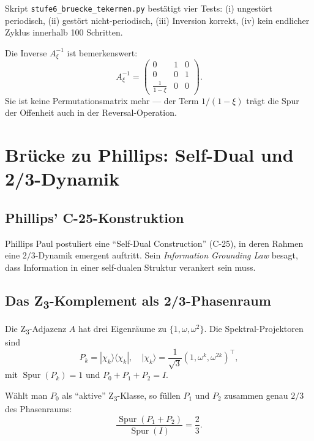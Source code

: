 Skript \texttt{stufe6\_bruecke\_tekermen.py} bestätigt vier Tests: (i) ungestört periodisch, (ii) gestört nicht-periodisch, (iii) Inversion korrekt, (iv) kein endlicher Zyklus innerhalb 100 Schritten.

Die Inverse \(A_\xi^{-1}\) ist bemerkenswert:
\begin{equation}
A_\xi^{-1} = \begin{pmatrix} 0 & 1 & 0 \\ 0 & 0 & 1 \\ \frac{1}{1-\xi} & 0 & 0 \end{pmatrix}.
\end{equation}
Sie ist keine Permutationsmatrix mehr — der Term \(1/(1-\xi)\) trägt die Spur der Offenheit auch in der Reversal-Operation.

\section{Brücke zu Phillips: Self-Dual und 2/3-Dynamik}
\label{sec:phillips}

\subsection{Phillips' C-25-Konstruktion}

Phillips Paul postuliert eine ``Self-Dual Construction'' (C-25), in deren Rahmen eine \(2/3\)-Dynamik emergent auftritt. Sein \emph{Information Grounding Law} besagt, dass Information in einer self-dualen Struktur verankert sein muss.

\subsection{Das Z\textsubscript{3}-Komplement als 2/3-Phasenraum}

Die Z\textsubscript{3}-Adjazenz \(A\) hat drei Eigenräume zu \(\{1, \omega, \omega^2\}\). Die Spektral-Projektoren sind
\begin{equation}
P_k = |\chi_k\rangle\langle\chi_k|, \quad |\chi_k\rangle = \frac{1}{\sqrt{3}}(1, \omega^k, \omega^{2k})^\top,
\end{equation}
mit \(\operatorname{Spur}(P_k) = 1\) und \(P_0 + P_1 + P_2 = I\).

\begin{keyresult}
Wählt man \(P_0\) als ``aktive'' Z\textsubscript{3}-Klasse, so füllen \(P_1\) und \(P_2\) zusammen genau \(2/3\) des Phasenraums:
\begin{equation}
\frac{\operatorname{Spur}(P_1 + P_2)}{\operatorname{Spur}(I)} = \frac{2}{3}.
\end{equation}
\end{keyresult}

